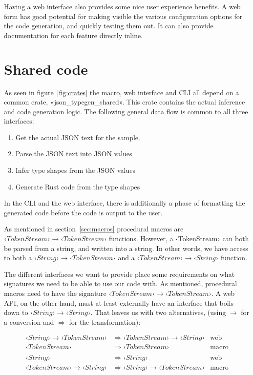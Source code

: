 Having a web interface also provides some nice user experience benefits. A web form has good potential for making visible the various configuration options for the code generation, and quickly testing them out. It can also provide documentation for each feature directly inline.

\section{Shared code}
\label{sec:shared-code}

As seen in figure~\ref{fig:crates} the macro, web interface and CLI all depend on a common crate, «json_typegen_shared». This crate contains the actual inference and code generation logic. The following general data flow is common to all three interfaces:

\begin{enumerate}
  \item Get the actual JSON text for the sample.
  \item Parse the JSON text into JSON values
  \item Infer type shapes from the JSON values
  \item Generate Rust code from the type shapes
\end{enumerate}

In the CLI and the web interface, there is additionally a phase of formatting the generated code before the code is output to the user.

As mentioned in section~\ref{sec:macros} procedural macros are $ ‹TokenStream› \rightarrow ‹TokenStream› $ functions. However, a ‹TokenStream› can both be parsed from a string, and written into a string. In other words, we have access to both a $ ‹String› \rightarrow ‹TokenStream› $ and a $ ‹TokenStream› \rightarrow ‹String› $ function.

The different interfaces we want to provide place some requirements on what signatures we need to be able to use our code with. As mentioned, procedural macros need to have the signature $ ‹TokenStream› \rightarrow ‹TokenStream› $. A web API, on the other hand, must at least externally have an interface that boils down to $ ‹String› \rightarrow ‹String› $. That leaves us with two alternatives, (using $\rightarrow$ for a conversion and $\Rightarrow$ for the transformation):

\begin{align*}
‹String› \rightarrow ‹TokenStream› &\Rightarrow ‹TokenStream› \rightarrow ‹String› & \text{web} \\
                   ‹TokenStream› &\Rightarrow ‹TokenStream›                    & \text{macro} \\
\\
                        ‹String› &\Rightarrow ‹String›                         & \text{web} \\
‹TokenStream› \rightarrow ‹String› &\Rightarrow ‹String› \rightarrow ‹TokenStream› & \text{macro}
\end{align*}

